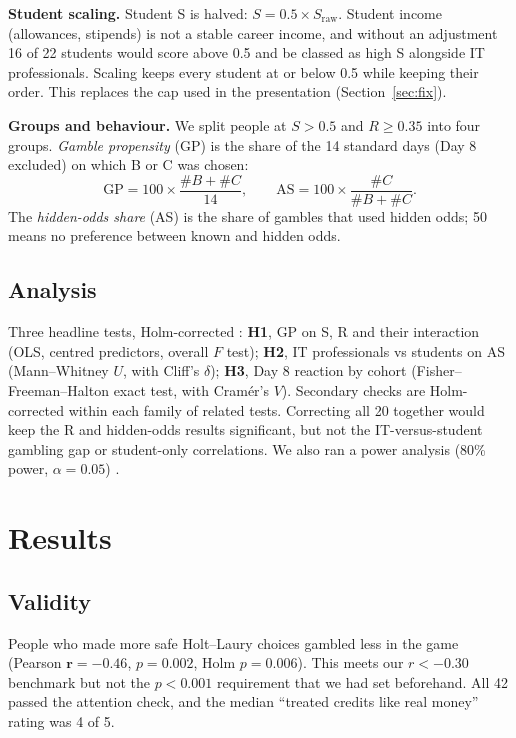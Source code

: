 \documentclass[10pt,a4paper]{article}
\newcommand{\Sraw}{S_{\text{raw}}}
\begin{document}
\textbf{Student scaling.} Student S is halved: $S = 0.5 \times \Sraw$. Student income (allowances, stipends) is not a stable career income, and without an adjustment 16 of 22 students would score above 0.5 and be classed as high S alongside IT professionals. Scaling keeps every student at or below 0.5 while keeping their order. This replaces the cap used in the presentation (Section~\ref{sec:fix}).

\textbf{Groups and behaviour.} We split people at $S>0.5$ and $R \ge 0.35$ into four groups. \emph{Gamble propensity} (GP) is the share of the 14 standard days (Day 8 excluded) on which B or C was chosen:
\[
\text{GP} = 100 \times \frac{\#B + \#C}{14}, \qquad
\text{AS} = 100 \times \frac{\#C}{\#B + \#C}.
\]
The \emph{hidden-odds share} (AS) is the share of gambles that used hidden odds; 50 means no preference between known and hidden odds.

\subsection{Analysis}

Three headline tests, Holm-corrected \cite{holm}: \textbf{H1}, GP on S, R and their interaction (OLS, centred predictors, overall $F$ test); \textbf{H2}, IT professionals vs students on AS (Mann--Whitney $U$, with Cliff's $\delta$); \textbf{H3}, Day 8 reaction by cohort (Fisher--Freeman--Halton exact test, with Cram\'er's $V$). Secondary checks are Holm-corrected within each family of related tests. Correcting all 20 together would keep the R and hidden-odds results significant, but not the IT-versus-student gambling gap or student-only correlations. We also ran a power analysis (80\% power, $\alpha = 0.05$) \cite{cohen}.

\section{Results}

\subsection{Validity}
People who made more safe Holt--Laury choices gambled less in the game (Pearson $\mathbf{r = -0.46}$, $p = 0.002$, Holm $p = 0.006$). This meets our $r < -0.30$ benchmark but not the $p < 0.001$ requirement that we had set beforehand. All 42 passed the attention check, and the median ``treated credits like real money'' rating was 4 of 5.
\end{document}
